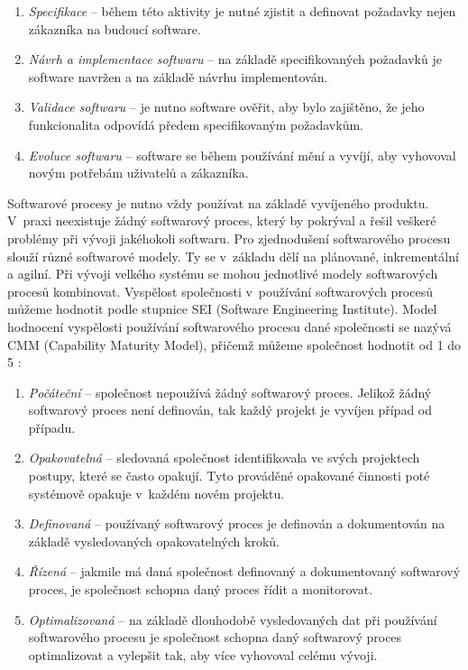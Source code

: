 \documentclass[czech,master]{diploma}
\begin{document}
\begin{enumerate}
\item \textit{Specifikace} -- během této aktivity je nutné zjistit a definovat požadavky nejen zákazníka na budoucí software.
\item \textit{Návrh a implementace softwaru} -- na základě specifikovaných požadavků je software navržen a na základě návrhu implementován.
\item \textit{Validace softwaru }-- je nutno software ověřit, aby bylo zajištěno, že jeho funkcionalita odpovídá předem specifikovaným požadavkům.
\item \textit{Evoluce softwaru} -- software se během používání mění a vyvíjí, aby vyhovoval novým potřebám uživatelů a zákazníka.
\end{enumerate}

Softwarové procesy je nutno vždy používat na základě vyvíjeného produktu. V~praxi neexistuje žádný softwarový proces, který by pokrýval a řešil veškeré problémy při vývoji jakéhokoli softwaru. Pro zjednodušení softwarového procesu slouží různé softwarové modely. Ty se v~základu dělí na plánované, inkrementální a agilní. Při vývoji velkého systému se mohou jednotlivé modely softwarových procesů kombinovat. Vyspělost společnosti v~používání softwarových procesů můžeme hodnotit podle stupnice SEI (Software
Engineering Institute). Model hodnocení vyspělosti používání softwarového procesu dané společnosti se nazývá CMM (Capability Maturity Model), přičemž můžeme společnost hodnotit od 1 do 5 \cite{ref:sw_process_vondrak}:

\begin{enumerate}
\item \textit{Počáteční} -- společnost nepoužívá žádný softwarový proces. Jelikož žádný softwarový proces není definován, tak každý projekt je vyvíjen případ od případu.
\item \textit{Opakovatelná} -- sledovaná společnost identifikovala ve svých projektech postupy, které se často opakují. Tyto prováděné opakované činnosti poté systémově opakuje v~každém novém projektu.
\item \textit{Definovaná} -- používaný softwarový proces je definován a dokumentován na základě vysledovaných opakovatelných kroků.
\item \textit{Řízená} -- jakmile má daná společnost definovaný a dokumentovaný softwarový proces, je společnost schopna daný proces řídit a monitorovat.
\item \textit{Optimalizovaná} -- na základě dlouhodobě vysledovaných dat při používání softwarového procesu je společnost schopna daný softwarový proces optimalizovat a vylepšit tak, aby více vyhovoval celému vývoji.
\end{enumerate}
\end{document}
